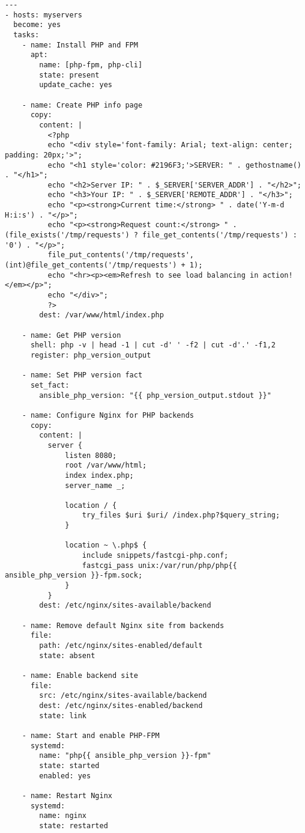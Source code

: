 \documentclass{article}
\begin{document}
\begin{lstlisting}
---
- hosts: myservers
  become: yes
  tasks:
    - name: Install PHP and FPM
      apt:
        name: [php-fpm, php-cli]
        state: present
        update_cache: yes
        
    - name: Create PHP info page
      copy:
        content: |
          <?php
          echo "<div style='font-family: Arial; text-align: center; padding: 20px;'>";
          echo "<h1 style='color: #2196F3;'>SERVER: " . gethostname() . "</h1>";
          echo "<h2>Server IP: " . $_SERVER['SERVER_ADDR'] . "</h2>";
          echo "<h3>Your IP: " . $_SERVER['REMOTE_ADDR'] . "</h3>";
          echo "<p><strong>Current time:</strong> " . date('Y-m-d H:i:s') . "</p>";
          echo "<p><strong>Request count:</strong> " . (file_exists('/tmp/requests') ? file_get_contents('/tmp/requests') : '0') . "</p>";
          file_put_contents('/tmp/requests', (int)@file_get_contents('/tmp/requests') + 1);
          echo "<hr><p><em>Refresh to see load balancing in action!</em></p>";
          echo "</div>";
          ?>
        dest: /var/www/html/index.php
        
    - name: Get PHP version
      shell: php -v | head -1 | cut -d' ' -f2 | cut -d'.' -f1,2
      register: php_version_output
      
    - name: Set PHP version fact
      set_fact:
        ansible_php_version: "{{ php_version_output.stdout }}"
        
    - name: Configure Nginx for PHP backends
      copy:
        content: |
          server {
              listen 8080;
              root /var/www/html;
              index index.php;
              server_name _;
              
              location / {
                  try_files $uri $uri/ /index.php?$query_string;
              }
              
              location ~ \.php$ {
                  include snippets/fastcgi-php.conf;
                  fastcgi_pass unix:/var/run/php/php{{ ansible_php_version }}-fpm.sock;
              }
          }
        dest: /etc/nginx/sites-available/backend
        
    - name: Remove default Nginx site from backends
      file:
        path: /etc/nginx/sites-enabled/default
        state: absent
        
    - name: Enable backend site
      file:
        src: /etc/nginx/sites-available/backend
        dest: /etc/nginx/sites-enabled/backend
        state: link
        
    - name: Start and enable PHP-FPM
      systemd:
        name: "php{{ ansible_php_version }}-fpm"
        state: started
        enabled: yes
        
    - name: Restart Nginx
      systemd:
        name: nginx
        state: restarted
\end{lstlisting}
\end{document}
